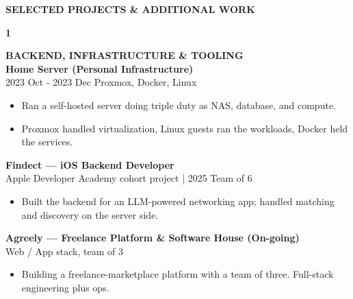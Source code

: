 \documentclass[11pt,a4paper]{article}
\begin{document}
\newpage


\vspace{1.2cm}

\begin{center}
{\large\bfseries\MakeUppercase{Selected Projects \& Additional Work}}
\end{center}

\vspace{0.5cm}

\hspace{1cm}
\begin{minipage}[t]{18cm}

\begin{minipage}[t]{0.8cm}
{\Large\bfseries 1}
\end{minipage}%
\begin{minipage}[t]{17cm}
{\large\bfseries BACKEND, INFRASTRUCTURE \& TOOLING}\\[8pt]

\textbf{Home Server (Personal Infrastructure)}\\
{\small 2023 Oct - 2023 Dec \textbar{} Proxmox, Docker, Linux}
\begin{itemize}[leftmargin=*, nosep, itemsep=2pt, topsep=2pt]
    \item Ran a self-hosted server doing triple duty as NAS, database, and compute.
    \item Proxmox handled virtualization, Linux guests ran the workloads, Docker held the services.
\end{itemize}

\vspace{0.3cm}

\textbf{Findect — iOS Backend Developer}\\
{\small Apple Developer Academy cohort project | 2025 \textbar{} Team of 6}
\begin{itemize}[leftmargin=*, nosep, itemsep=2pt, topsep=2pt]
    \item Built the backend for an LLM-powered networking app; handled matching and discovery on the server side.
\end{itemize}

\vspace{0.3cm}

\textbf{Agreely — Freelance Platform \& Software House (On-going)}\\
{\small Web / App stack, team of 3}
\begin{itemize}[leftmargin=*, nosep, itemsep=2pt, topsep=2pt]
    \item Building a freelance-marketplace platform with a team of three. Full-stack engineering plus ops.
\end{itemize}


\end{minipage}
\end{minipage}
\end{document}
